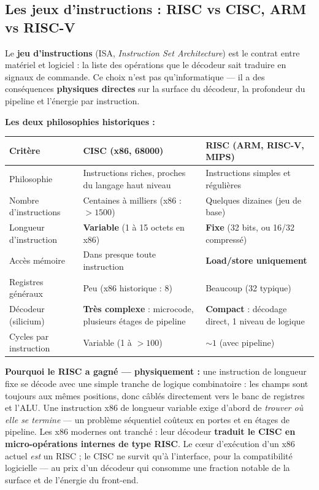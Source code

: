 \documentclass[12pt,a4paper,twoside]{book}
\begin{document}
\subsection{Les jeux d'instructions : RISC vs CISC, ARM vs RISC-V}

Le \textbf{jeu d'instructions} (ISA, \textit{Instruction Set Architecture}) est le contrat entre matériel et logiciel : la liste des opérations que le décodeur sait traduire en signaux de commande. Ce choix n'est pas qu'informatique --- il a des conséquences \textbf{physiques directes} sur la surface du décodeur, la profondeur du pipeline et l'énergie par instruction.

\begin{formule}
\textbf{Les deux philosophies historiques :}

\begin{center}
\renewcommand{\arraystretch}{1.45}
\begin{tabular}{p{3.2cm}p{4.7cm}p{4.7cm}}
\toprule
\textbf{Critère} & \textbf{CISC} (x86, 68000) & \textbf{RISC} (ARM, RISC-V, MIPS) \\
\midrule
Philosophie & Instructions riches, proches du langage haut niveau & Instructions simples et régulières \\
Nombre d'instructions & Centaines à milliers (x86 : $>1500$) & Quelques dizaines (jeu de base) \\
Longueur d'instruction & \textbf{Variable} (1 à 15 octets en x86) & \textbf{Fixe} (32 bits, ou 16/32 compressé) \\
Accès mémoire & Dans presque toute instruction & \textbf{Load/store uniquement} \\
Registres généraux & Peu (x86 historique : 8) & Beaucoup (32 typique) \\
Décodeur (silicium) & \textbf{Très complexe} : microcode, plusieurs étages de pipeline & \textbf{Compact} : décodage direct, 1 niveau de logique \\
Cycles par instruction & Variable (1 à $>100$) & $\sim 1$ (avec pipeline) \\
\bottomrule
\end{tabular}
\end{center}
\end{formule}

\begin{intuition}
\textbf{Pourquoi le RISC a gagné --- physiquement :} une instruction de longueur fixe se décode avec une simple tranche de logique combinatoire : les champs sont toujours aux mêmes positions, donc câblés directement vers le banc de registres et l'ALU. Une instruction x86 de longueur variable exige d'abord de \textit{trouver où elle se termine} --- un problème séquentiel coûteux en portes et en étages de pipeline. Les x86 modernes ont tranché : leur décodeur \textbf{traduit le CISC en micro-opérations internes de type RISC}. Le cœur d'exécution d'un x86 actuel \textit{est} un RISC ; le CISC ne survit qu'à l'interface, pour la compatibilité logicielle --- au prix d'un décodeur qui consomme une fraction notable de la surface et de l'énergie du front-end.
\end{intuition}
\end{document}
